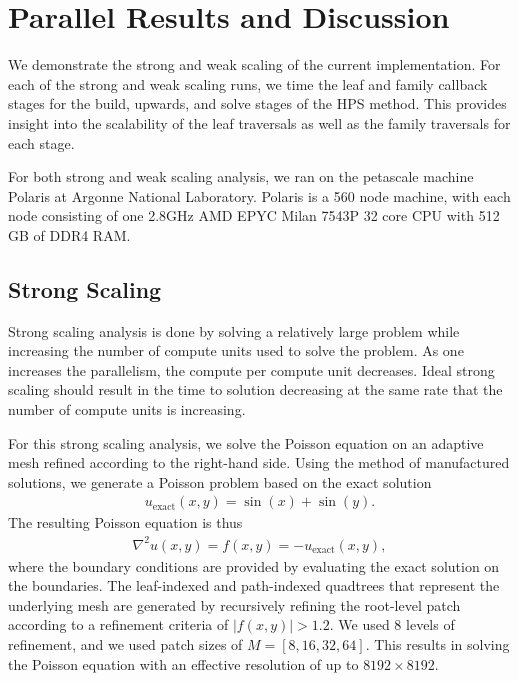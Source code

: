 \section{Parallel Results and Discussion}
\label{sec:parallel-results-and-discussion}

We demonstrate the strong and weak scaling of the current implementation. For each of the strong and weak scaling runs, we time the leaf and family callback stages for the build, upwards, and solve stages of the HPS method. This provides insight into the scalability of the leaf traversals as well as the family traversals for each stage.

For both strong and weak scaling analysis, we ran on the petascale machine Polaris at Argonne National Laboratory. Polaris is a 560 node machine, with each node consisting of one 2.8GHz AMD EPYC Milan 7543P 32 core CPU with 512 GB of DDR4 RAM.

\subsection{Strong Scaling}

Strong scaling analysis is done by solving a relatively large problem while increasing the number of compute units used to solve the problem. As one increases the parallelism, the compute per compute unit decreases. Ideal strong scaling should result in the time to solution decreasing at the same rate that the number of compute units is increasing.

For this strong scaling analysis, we solve the Poisson equation on an adaptive mesh refined according to the right-hand side. Using the method of manufactured solutions, we generate a Poisson problem based on the exact solution
\begin{align}
    u_{\text{exact}}(x, y) = \sin(x) + \sin(y).
\end{align}
The resulting Poisson equation is thus
\begin{align}
    \nabla^2 u(x,y) = f(x,y) = -u_{\text{exact}}(x, y),
\end{align}
where the boundary conditions are provided by evaluating the exact solution on the boundaries. The leaf-indexed and path-indexed quadtrees that represent the underlying mesh are generated by recursively refining the root-level patch according to a refinement criteria of $|f(x,y)| > 1.2$. We used 8 levels of refinement, and we used patch sizes of $M = [8, 16, 32, 64]$. This results in solving the Poisson equation with an effective resolution of up to $8192 \times 8192$.

